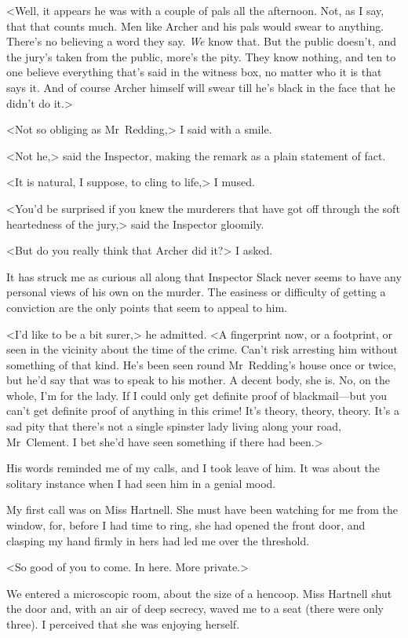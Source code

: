 <Well, it appears he was with a couple of pals all the afternoon. Not, as I say, that that counts much. Men like Archer and his pals would swear to anything. There's no believing a word they say. \emph{We} know that. But the public doesn't, and the jury's taken from the public, more's the pity. They know nothing, and ten to one believe everything that's said in the witness box, no matter who it is that says it. And of course Archer himself will swear till he's black in the face that he didn't do it.>

<Not so obliging as Mr~Redding,> I said with a smile.

<Not he,> said the Inspector, making the remark as a plain statement of fact.

<It is natural, I suppose, to cling to life,> I mused.

<You'd be surprised if you knew the murderers that have got off through the soft heartedness of the jury,> said the Inspector gloomily.

<But do you really think that Archer did it?> I asked.

It has struck me as curious all along that Inspector Slack never seems to have any personal views of his own on the murder. The easiness or difficulty of getting a conviction are the only points that seem to appeal to him.

<I'd like to be a bit surer,> he admitted. <A fingerprint now, or a footprint, or seen in the vicinity about the time of the crime. Can't risk arresting him without something of that kind. He's been seen round Mr~Redding's house once or twice, but he'd say that was to speak to his mother. A decent body, she is. No, on the whole, I'm for the lady. If I could only get definite proof of blackmail—but you can't get definite proof of anything in this crime! It's theory, theory, theory. It's a sad pity that there's not a single spinster lady living along your road, Mr~Clement. I bet she'd have seen something if there had been.>

His words reminded me of my calls, and I took leave of him. It was about the solitary instance when I had seen him in a genial mood.

My first call was on Miss Hartnell. She must have been watching for me from the window, for, before I had time to ring, she had opened the front door, and clasping my hand firmly in hers had led me over the threshold.

<So good of you to come. In here. More private.>

We entered a microscopic room, about the size of a hencoop. Miss Hartnell shut the door and, with an air of deep secrecy, waved me to a seat (there were only three). I perceived that she was enjoying herself.

